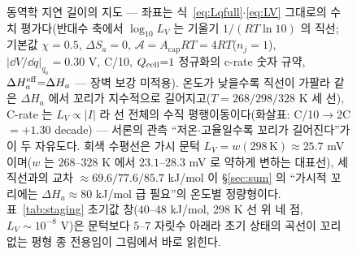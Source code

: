 \begin{figure}[t]
\caption{동역학 지연 길이의 지도 --- 좌표는 식~\eqref{eq:Lqfull}$\cdot$\eqref{eq:LV} 그대로의 수치
평가다(반대수 축에서 $\log_{10}L_V$ 는 기울기 $1/(RT\ln10)$ 의 직선; 기본값 $\chi{=}0.5$,
$\Delta S_a{=}0$, $\mathcal A{=}A_\mathrm{cap}RT{=}4RT$($n_j{=}1$),
$|\dd V/\dd q|_{q_a}{=}0.30$ V, C/10, $Q_{\mathrm{cell}}{=}1$ 정규화의 c-rate 숫자 규약,
$\Delta H_a^{\mathrm{eff}}{=}\Delta H_a$ --- 장벽 보강 미적용). 온도가 낮을수록 직선이 가팔라 같은
$\Delta H_a$ 에서 꼬리가 지수적으로 길어지고($T{=}268/298/328$ K 세 선), C-rate 는 $L_V\propto|I|$
라 선 전체의 수직 평행이동이다(화살표: C/10$\to$2C $=+1.30$ decade) --- 서론의 관측
``저온$\cdot$고율일수록 꼬리가 길어진다''가 이 두 자유도다. 회색 수평선은 가시 문턱
$L_V{=}w(298\,\mathrm K){\approx}25.7$ mV 이며($w$ 는 $268$--$328$ K 에서 $23.1$--$28.3$ mV 로 약하게
변하는 대표선), 세 직선과의 교차 $\approx69.6/77.6/85.7$ kJ/mol 이 \S\ref{sec:sum} 의 ``가시적 꼬리에는
$\Delta H_a\approx80$ kJ/mol 급 필요''의 온도별 정량형이다. 표~\ref{tab:staging} 초기값
창($40$--$48$ kJ/mol, 298 K 선 위 네 점, $L_V\sim10^{-8}$ V)은 문턱보다 $5$--$7$ 자릿수 아래라 초기
상태의 곡선이 꼬리 없는 평형 종 전용임이 그림에서 바로 읽힌다.}
\label{fig:cand-ff3-2}
\end{figure}
